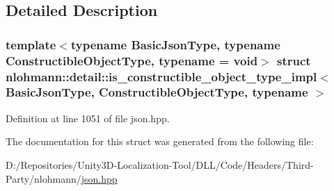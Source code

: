 \subsection{Detailed Description}
\subsubsection*{template$<$typename Basic\+Json\+Type, typename Constructible\+Object\+Type, typename = void$>$\newline
struct nlohmann\+::detail\+::is\+\_\+constructible\+\_\+object\+\_\+type\+\_\+impl$<$ Basic\+Json\+Type, Constructible\+Object\+Type, typename $>$}



Definition at line 1051 of file json.\+hpp.



The documentation for this struct was generated from the following file\+:\begin{DoxyCompactItemize}
\item 
D\+:/\+Repositories/\+Unity3\+D-\/\+Localization-\/\+Tool/\+D\+L\+L/\+Code/\+Headers/\+Third-\/\+Party/nlohmann/\mbox{\hyperlink{json_8hpp}{json.\+hpp}}\end{DoxyCompactItemize}
